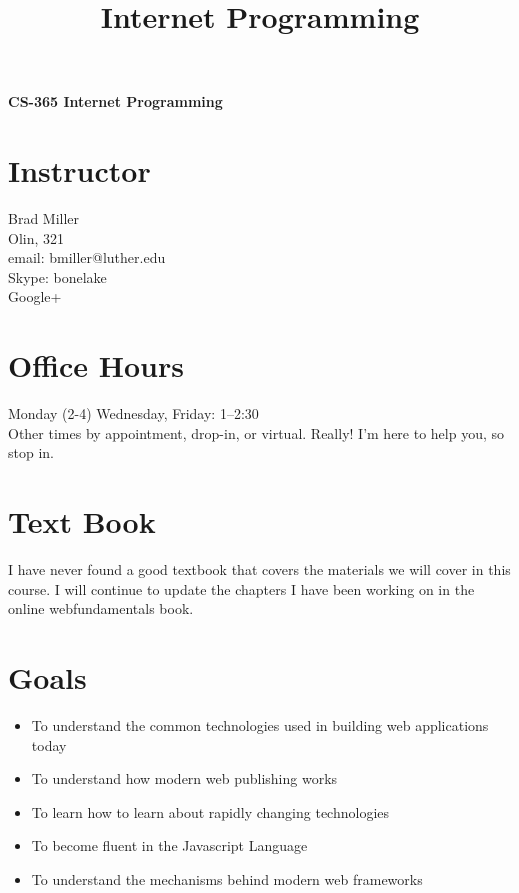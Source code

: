 \documentclass[11pt,twocolumn]{article}
\title{Internet Programming}
\author{}
\begin{document}
\begin{center}
	{\sffamily\LARGE\bfseries CS-365 Internet Programming}
\end{center}

\section*{Instructor}
Brad Miller \\
Olin, 321 \\
email:  bmiller@luther.edu \\
Skype:  bonelake \\
Google+ \\

\section*{Office Hours}
Monday (2-4) Wednesday, Friday: 1--2:30 \\
Other times by appointment, drop-in, or virtual.  Really! I'm here to help you, so stop in.

\section*{Text Book}

I have never found a good textbook that covers the materials we will cover in this course.  I will continue to update the chapters I have been working on in the online webfundamentals book.

\section*{Goals}

\begin{itemize}
    \item To understand the common technologies used in building web applications today
    \item To understand how modern web publishing works
    \item To learn how to learn about rapidly changing technologies
    \item To become fluent in the Javascript Language
    \item To understand the mechanisms behind modern web frameworks
\end{itemize}
\end{document}
